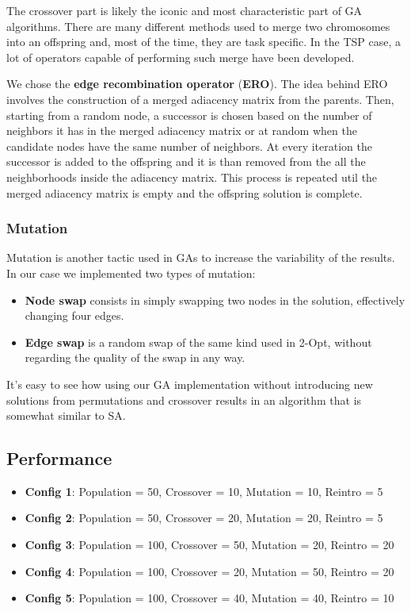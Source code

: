 The crossover part is likely the iconic and most characteristic part of GA algorithms.
There are many different methods used to merge two chromosomes into an offspring and, most of the time, they are task specific.
In the TSP case, a lot of operators capable of performing such merge have been developed.

We chose the \textbf{edge recombination operator} (\textbf{ERO}).
The idea behind ERO involves the construction of a merged adiacency matrix from the parents.
Then, starting from a random node, a successor is chosen based on the number of neighbors it has in the merged adiacency matrix or at random when the candidate nodes have the same number of neighbors.
At every iteration the successor is added to the offspring and it is than removed from the all the neighborhoods inside the adiacency matrix.
This process is repeated util the merged adiacency matrix is empty and the offspring solution is complete.

\subsubsection{Mutation}

Mutation is another tactic used in GAs to increase the variability of the results.
In our case we implemented two types of mutation:
\begin{itemize}
    \item \textbf{Node swap} consists in simply swapping two nodes in the solution, effectively changing four edges.
    \item \textbf{Edge swap} is a random swap of the same kind used in 2-Opt, without regarding the quality of the swap in any way.
\end{itemize}

It's easy to see how using our GA implementation without introducing new solutions from permutations and crossover results in an algorithm that is somewhat similar to SA.

\subsection{Performance}

\begin{itemize}
    \item \textbf{Config 1}: Population = 50, Crossover = 10, Mutation = 10, Reintro =  5
    \item \textbf{Config 2}: Population = 50, Crossover = 20, Mutation = 20, Reintro =  5
    \item \textbf{Config 3}: Population = 100, Crossover = 50, Mutation = 20, Reintro = 20
    \item \textbf{Config 4}: Population = 100, Crossover = 20, Mutation = 50, Reintro = 20
    \item \textbf{Config 5}: Population = 100, Crossover = 40, Mutation = 40, Reintro = 10
\end{itemize}

